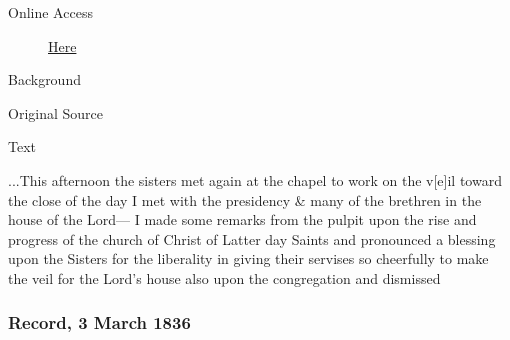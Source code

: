 				\begin{description}
					\item[Online Access] \href{https://www.josephsmithpapers.org/paper-summary/journal-1835-1836/162}{Here}
				\end{description}
				
				\begin{description}
					\item[Background]
				\end{description}
				
				
				\begin{description}
					\item[Original Source]
				\end{description}
				
				
				\begin{description}
					\item[Text]
				\end{description}
				
					...This afternoon the sisters met again at the chapel to work on the v[e]il toward the close of the day I met with the presidency \& many of the brethren in the house of the Lord--- I made some remarks from the pulpit upon the rise and progress of the church of Christ of Latter day Saints and pronounced a blessing upon the Sisters for the liberality in giving their servises so cheerfully to make the veil for the Lord's house also upon the congregation and dismissed
					
		\subsubsection{Record, 3 March 1836}
			\label{EMS-1836-JS-3-MAR-1836}
			
